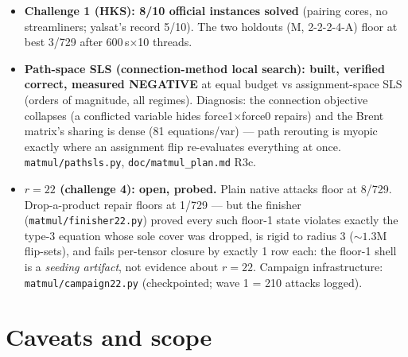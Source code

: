 \documentclass[10pt]{article}
\begin{document}
\begin{itemize}
\item \textbf{Challenge 1 (HKS): 8/10 official instances solved}
  (pairing cores, no streamliners; yalsat's record 5/10). The two
  holdouts (M, 2-2-2-4-A) floor at best 3/729 after
  600\,s$\times$10 threads.
\item \textbf{Path-space SLS (connection-method local search): built,
  verified correct, measured NEGATIVE} at equal budget vs
  assignment-space SLS (orders of magnitude, all regimes). Diagnosis:
  the connection objective collapses (a conflicted variable hides
  force1$\times$force0 repairs) and the Brent matrix's sharing is
  dense (81 equations/var) --- path rerouting is myopic exactly where
  an assignment flip re-evaluates everything at once.
  \texttt{matmul/pathsls.py}, \texttt{doc/matmul\_plan.md} R3c.
\item \textbf{$r{=}22$ (challenge 4): open, probed.} Plain native
  attacks floor at 8/729. Drop-a-product repair floors at 1/729 ---
  but the finisher (\texttt{matmul/finisher22.py}) proved every such
  floor-1 state violates exactly the type-3 equation whose sole cover
  was dropped, is rigid to radius 3 (${\sim}1.3$M flip-sets), and
  fails per-tensor closure by exactly 1 row each: the floor-1 shell
  is a \emph{seeding artifact}, not evidence about $r{=}22$. Campaign
  infrastructure: \texttt{matmul/campaign22.py} (checkpointed; wave 1
  = 210 attacks logged).
\end{itemize}

\section{Caveats and scope}\label{sec:caveats}
\end{document}

